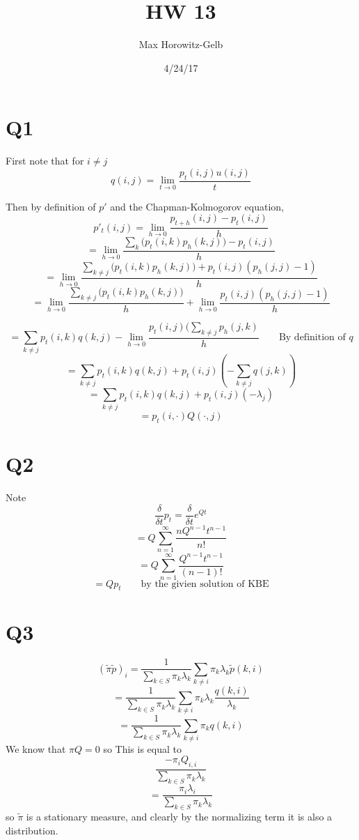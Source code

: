 \documentclass{article}
\title{HW 13}
\date{4/24/17}
\author{Max Horowitz-Gelb}
\begin{document}
\maketitle

\section*{Q1}
First note that for $i \neq j$
$$
q(i,j) = \lim_{t \to 0} \frac{p_t(i,j) u(i,j)}{t}
$$


Then by definition of $p'$ and the Chapman-Kolmogorov equation,
$$
p'_t(i,j) =  \lim_{h \to 0} \frac{p_{t+h}(i,j) - p_t(i,j)}{h}
$$
$$
= \lim_{h \to 0} \frac{\sum_{k} \big(p_t(i,k) p_h(k,j)\big) - p_t(i,j)}{h}
$$
$$
= \lim_{h \to 0} \frac{\sum_{k\neq j} \big(p_t(i,k) p_h(k,j)\big) + p_t(i,j)(p_h(j,j)-1)}{h}
$$
$$
= \lim_{h \to 0} \frac{\sum_{k\neq j} \big(p_t(i,k) p_h(k,j)\big)}{h} + \lim_{h \to 0} \frac{p_t(i,j)(p_h(j,j)-1)}{h}
$$

$$
= \sum_{k\neq j} p_t(i,k) q(k,j) - \lim_{h \to 0} \frac{p_t(i,j)(\sum_{k\neq j} p_h(j,k)}{h}
\qquad \text{By definition of }q
$$
$$
= \sum_{k\neq j} p_t(i,k) q(k,j)  + p_t(i,j)(-\sum_{k\neq j} q(j,k))
$$
$$
= \sum_{k\neq j} p_t(i,k) q(k,j)  + p_t(i,j)(-\lambda_j)
$$
$$
= p_t(i,\cdot) Q(\cdot,j)
$$

\section*{Q2}
Note
$$
\frac{\delta}{\delta t} p_t = \frac{\delta}{\delta t} e^{Qt}
$$
$$
= Q \sum_{n=1} ^\infty \frac{n Q^{n-1} t^{n-1}}{n!}
$$
$$
= Q \sum_{n=1} ^\infty \frac{Q^{n-1} t^{n-1}}{(n-1)!} 
$$
$$
= Q p_t \qquad \text{by the givien solution of KBE}
$$

\section*{Q3}

$$
(\tilde{\pi}\tilde{p})_i = \frac{1}{\sum_{k\in S} \pi_k\lambda_k} \sum_{k \neq i} \pi_k \lambda_k \tilde{p}(k,i)
$$
$$
= \frac{1}{\sum_{k\in S} \pi_k\lambda_k} \sum_{k \neq i} \pi_k \lambda_k \frac{q(k,i)}{\lambda_k}
$$
$$
= \frac{1}{\sum_{k\in S} \pi_k\lambda_k} \sum_{k \neq i} \pi_k q(k,i)
$$
We know that $\pi Q = 0$ so This is equal to 
$$
\frac{-\pi_i Q_{i,i}}{\sum_{k\in S} \pi_k\lambda_k} 
$$
$$
= \frac{\pi_i \lambda_i}{\sum_{k\in S} \pi_k\lambda_k} 
$$
so $\tilde{\pi}$ is a stationary measure, and clearly by the normalizing term it is also a distribution.
\end{document}
